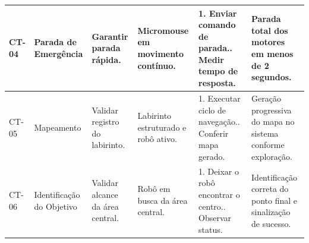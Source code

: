 \begin{table}[htbp]
{\begin{tabular}{|l|p{3cm}|p{4cm}|p{3.5cm}|p{4.5cm}|p{4cm}|}
            CT-04 & 
            Parada de Emergência & 
            Garantir parada rápida. & 
            Micromouse em movimento contínuo. & 
            1. Enviar comando de parada.\newline 2. Medir tempo de resposta. & 
            Parada total dos motores em menos de 2 segundos. \\ 
            \hline
            
            CT-05 & 
            Mapeamento & 
            Validar registro do labirinto. & 
            Labirinto estruturado e robô ativo. & 
            1. Executar ciclo de navegação.\newline 2. Conferir mapa gerado. & 
            Geração progressiva do mapa no sistema conforme exploração. \\ 
            \hline
            
            CT-06 & 
            Identificação do Objetivo & 
            Validar alcance da área central. & 
            Robô em busca da área central. & 
            1. Deixar o robô encontrar o centro.\newline 2. Observar status. & 
            Identificação correta do ponto final e sinalização de sucesso. \\ 
            \hline
        \end{tabular}%
    }
\end{table}





